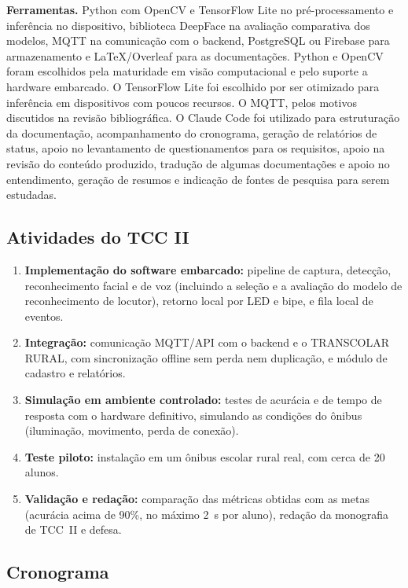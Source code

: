 \documentclass[
    12pt,
    oneside,
    a4paper,
    article,
    english,
    brazil
    ]{abntex2}
\begin{document}
\textbf{Ferramentas.} Python com OpenCV e TensorFlow Lite no pré-processamento
e inferência no dispositivo, biblioteca DeepFace na avaliação comparativa dos
modelos, MQTT na comunicação com o backend, PostgreSQL ou Firebase para
armazenamento e LaTeX/Overleaf para as documentações. Python e OpenCV foram
escolhidos pela maturidade em visão computacional e pelo suporte a hardware
embarcado. O TensorFlow Lite foi escolhido por ser otimizado para inferência
em dispositivos com poucos recursos. O MQTT, pelos motivos discutidos na
revisão bibliográfica. O Claude Code foi utilizado para estruturação da
documentação, acompanhamento do cronograma, geração de relatórios de status,
apoio no levantamento de questionamentos para os requisitos, apoio na revisão
do conteúdo produzido, tradução de algumas documentações e apoio no
entendimento, geração de resumos e indicação de fontes de pesquisa para serem
estudadas.

\subsection{Atividades do TCC II}

\begin{enumerate}
    \item \textbf{Implementação do software embarcado:} pipeline de captura,
          detecção, reconhecimento facial e de voz (incluindo a seleção e a
          avaliação do modelo de reconhecimento de locutor), retorno local
          por LED e bipe, e fila local de eventos.
    \item \textbf{Integração:} comunicação MQTT/API com o backend e o TRANSCOLAR
          RURAL, com sincronização offline sem perda nem duplicação, e módulo
          de cadastro e relatórios.
    \item \textbf{Simulação em ambiente controlado:} testes de acurácia e de
          tempo de resposta com o hardware definitivo, simulando as condições
          do ônibus (iluminação, movimento, perda de conexão).
    \item \textbf{Teste piloto:} instalação em um ônibus escolar rural real,
          com cerca de 20 alunos.
    \item \textbf{Validação e redação:} comparação das métricas obtidas com as
          metas (acurácia acima de 90\%, no máximo 2~s por aluno), redação da
          monografia de TCC~II e defesa.
\end{enumerate}

\subsection{Cronograma}
\end{document}
